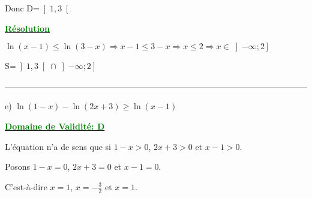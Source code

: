 \documentclass[12pt]{article}
\begin{document}
Donc D=$\left]1 , 3 \right[ $

\textbf{\underline{\textcolor{green}{Résolution}}}

$\ln(x-1)\leq\ln(3-x)\Longrightarrow x-1\leq3-x\Longrightarrow x\leq 2 \Longrightarrow x\in\left]-\infty ; 2\right] $

S=$\left]1 , 3 \right[\cap\left]-\infty ; 2\right]$

\textcolor{green}{\boxed{S=\left]1; 2\right]}}

------------------------------------------------------------------------------------------------------------

e) $\ln(1-x)-\ln(2x+3)\geq\ln(x-1)$

\textbf{\underline{\textcolor{green}{Domaine de Validité: D}}}

L'équation n'a de sens que si $1-x>0$, $2x+3>0$ et $x-1>0$.

Posons $1-x=0$, $2x+3=0$ et $x-1=0$.

C'est-à-dire $x=1$, $x=-\frac{3}{2}$ et $x=1$.
\end{document}
